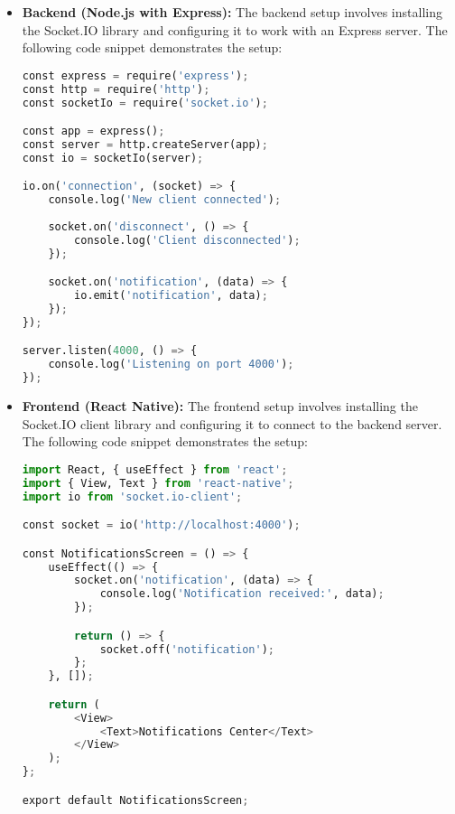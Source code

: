 \begin{itemize}
    \item \textbf{Backend (Node.js with Express):} The backend setup involves installing the Socket.IO library and configuring it to work with an Express server. The following code snippet demonstrates the setup:

\begin{lstlisting}[language=Python, caption=Backend Socket.IO Setup, frame=single, framerule=0.5pt]
const express = require('express');
const http = require('http');
const socketIo = require('socket.io');

const app = express();
const server = http.createServer(app);
const io = socketIo(server);

io.on('connection', (socket) => {
    console.log('New client connected');
    
    socket.on('disconnect', () => {
        console.log('Client disconnected');
    });

    socket.on('notification', (data) => {
        io.emit('notification', data);
    });
});

server.listen(4000, () => {
    console.log('Listening on port 4000');
});
\end{lstlisting}

    \item \textbf{Frontend (React Native):} The frontend setup involves installing the Socket.IO client library and configuring it to connect to the backend server. The following code snippet demonstrates the setup:

\begin{lstlisting}[language=Python, caption=Frontend Socket.IO Setup, frame=single, framerule=0.5pt]
import React, { useEffect } from 'react';
import { View, Text } from 'react-native';
import io from 'socket.io-client';

const socket = io('http://localhost:4000');

const NotificationsScreen = () => {
    useEffect(() => {
        socket.on('notification', (data) => {
            console.log('Notification received:', data);
        });

        return () => {
            socket.off('notification');
        };
    }, []);

    return (
        <View>
            <Text>Notifications Center</Text>
        </View>
    );
};

export default NotificationsScreen;
\end{lstlisting}
\end{itemize}


